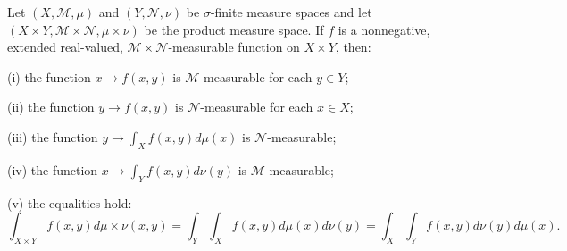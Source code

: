Let $(X, \mathcal{M}, \mu)$ and $(Y, \mathcal{N}, \nu)$ be $\sigma$-finite measure spaces and let $(X \times Y, \mathcal{M} \times \mathcal{N}, \mu \times \nu)$ be the product measure space. If $f$ is a nonnegative, extended real-valued, $\mathcal{M} \times \mathcal{N}$-measurable function on $X \times Y$, then:

(i) the function $x \to f(x, y)$ is $\mathcal{M}$-measurable for each $y \in Y$;

(ii) the function $y \to f(x, y)$ is $\mathcal{N}$-measurable for each $x \in X$;

(iii) the function $y \to \int_X f(x, y) d\mu(x)$ is $\mathcal{N}$-measurable;

(iv) the function $x \to \int_Y f(x, y) d\nu(y)$ is $\mathcal{M}$-measurable;

(v) the equalities hold:
$$\int_{X \times Y} f(x, y) d\mu \times \nu(x, y) = \int_Y \int_X f(x, y) d\mu(x) d\nu(y) = \int_X \int_Y f(x, y) d\nu(y) d\mu(x).$$
